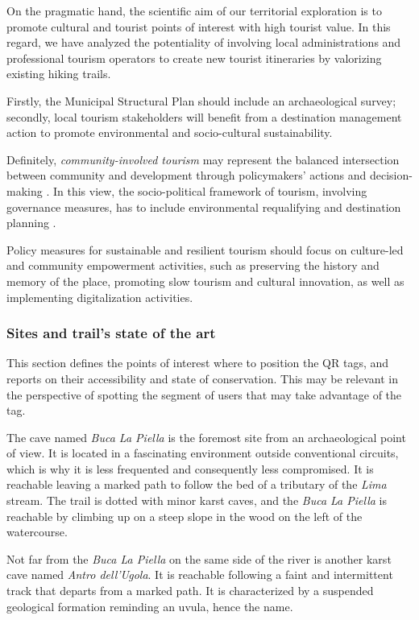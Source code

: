 \documentclass[sustainability,article,submit,pdftex,moreauthors]{Definitions/mdpi}
\begin{document}
On the pragmatic hand, the scientific aim of our territorial exploration is to promote cultural and tourist points of interest with high tourist value. In this regard, we have analyzed the potentiality of involving local administrations and professional tourism operators to create new tourist itineraries by valorizing existing hiking trails.

Firstly, the Municipal Structural Plan should include an archaeological survey; secondly, local tourism stakeholders will benefit from a destination management action to promote environmental and socio-cultural sustainability. 

Definitely, \textit{community-involved tourism} may represent the balanced intersection between community and development through policymakers' actions and decision-making \cite {jam14}.
In this view, the socio-political framework of tourism, involving governance measures, has to include environmental requalifying and destination planning \cite {ric03}. 

Policy measures for sustainable and resilient tourism should focus on culture-led and community empowerment activities, such as preserving the history and memory of the place, promoting slow tourism and cultural innovation, as well as implementing digitalization activities.

\subsubsection{Sites and trail’s state of the art \label{sec:soa}}

This section defines the points of interest where to position the QR tags, and reports on their accessibility and state of conservation. This may be relevant in the perspective of spotting the segment of users that may take advantage of the tag. 

The cave named {\em Buca La Piella} is the foremost site from an archaeological point of view. It is located in a fascinating environment outside conventional circuits, which is why it is less frequented and consequently less compromised. It is reachable leaving a marked path to follow the bed of a tributary of the \emph{Lima} stream. The trail is dotted with minor karst caves, and the {\em Buca La Piella} is reachable by climbing up on a steep slope in the wood on the left of the watercourse. 

Not far from the {\em Buca La Piella} on the same side of the river is another karst cave named {\em Antro dell'Ugola}. It is reachable following a faint and intermittent track that departs from a marked path. It is characterized by a suspended geological formation reminding an uvula, hence the name.
\end{document}
